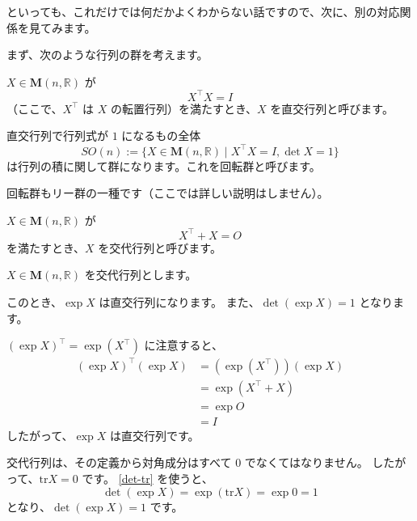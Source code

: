\documentclass[a5paper]{ltjsarticle}
\begin{document}
といっても、これだけでは何だかよくわからない話ですので、次に、別の対応関係を見てみます。

まず、次のような行列の群を考えます。

\begin{usmdefinition}[回転群]
    \(X \in \mathbf{M}(n,\mathbb{R})\) が
    \[
        X^{\intercal}X = I
    \]
    （ここで、\(X^{\intercal}\) は \(X\) の転置行列）を満たすとき、\(X\) を直交行列と呼びます。

    直交行列で行列式が \(1\) になるもの全体
    \[
        \mathit{SO}(n) := \{ X \in \mathbf{M}(n,\mathbb{R}) \mid X^{\intercal}X = I, \det X = 1 \}
    \]
    は行列の積に関して群になります。これを回転群と呼びます。
\end{usmdefinition}

回転群もリー群の一種です（ここでは詳しい説明はしません）。

\begin{usmdefinition}[交代行列]
    \(X \in \mathbf{M}(n,\mathbb{R})\) が
    \[
        X^{\intercal} + X = O
    \]
    を満たすとき、\(X\) を交代行列と呼びます。
\end{usmdefinition}

\begin{usmproposition}[交代行列と直交行列]
    \(X \in \mathbf{M}(n,\mathbb{R})\) を交代行列とします。

    このとき、\(\exp X\) は直交行列になります。
    また、\(\det (\exp X) = 1\) となります。
\end{usmproposition}
\begin{usmproof}
    \({(\exp X)}^{\intercal} = \exp (X^{\intercal})\) に注意すると、
    \begin{align*}
        {(\exp X)}^{\intercal} (\exp X) & = (\exp (X^{\intercal})) (\exp X) \\
                                        & = \exp (X^{\intercal} + X)        \\
                                        & = \exp O                          \\
                                        & = I
    \end{align*}
    したがって、\(\exp X\) は直交行列です。

    交代行列は、その定義から対角成分はすべて \(0\) でなくてはなりません。
    したがって、\(\mathrm{tr} X = 0\) です。
    \autoref{det-tr} を使うと、
    \[
        \det (\exp X) = \exp (\mathrm{tr} X) = \exp 0 = 1
    \]
    となり、\(\det (\exp X) = 1\) です。
\end{usmproof}
\end{document}
